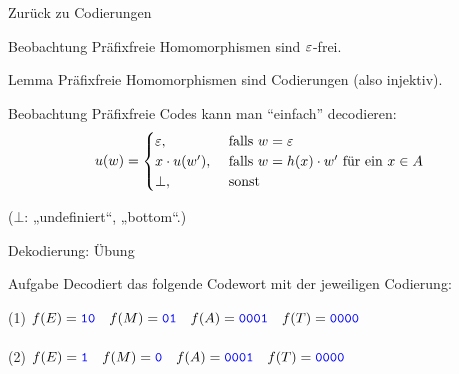 \begin{frame}{Zurück zu Codierungen}
	\begin{block}{Beobachtung}
		Präfixfreie Homomorphismen sind $\varepsilon$-frei.
	\end{block}

	\pause
	\begin{block}{Lemma}
		Präfixfreie Homomorphismen sind Codierungen (also injektiv).
	\end{block}

	\pause
	\begin{block}{Beobachtung}
		Präfixfreie Codes kann man \enquote{einfach} decodieren:
		\[
		u(w) = 
		\begin{cases}
		\varepsilon, & \text{ falls } w=\varepsilon\\
		x\cdot u(w'), & \text{ falls } w=h(x) \cdot w' \text{ für ein } x\in A \\
		\bot,  & \text{ sonst }\\
		\end{cases}
		\]
	\end{block}
	($\bot$: „undefiniert“, „bottom“.)
	
\end{frame}

\begin{frame}{Dekodierung: Übung}
	\begin{block}{Aufgabe}
	Decodiert das folgende Codewort mit der jeweiligen Codierung:\\
	\smallskip
	
	(1) $f(E) = \hbox{\textcolor{blue}{\texttt{10}}} \quad f(M) = \hbox{\textcolor{blue}{\texttt{01}}} \quad f(A) = \hbox{\textcolor{blue}{\texttt{0001}}} \quad f(T) = \hbox{\textcolor{blue}{\texttt{0000}}}$ \\
	\\[0.5em]
	(2) $f(E) = \hbox{\textcolor{blue}{\texttt{1}}} \quad f(M) = \hbox{\textcolor{blue}{\texttt{0}}} \quad f(A) = \hbox{\textcolor{blue}{\texttt{0001}}} \quad f(T) = \hbox{\textcolor{blue}{\texttt{0000}}}$ \\
	\\[0.5em]
	\end{block}
\end{frame}